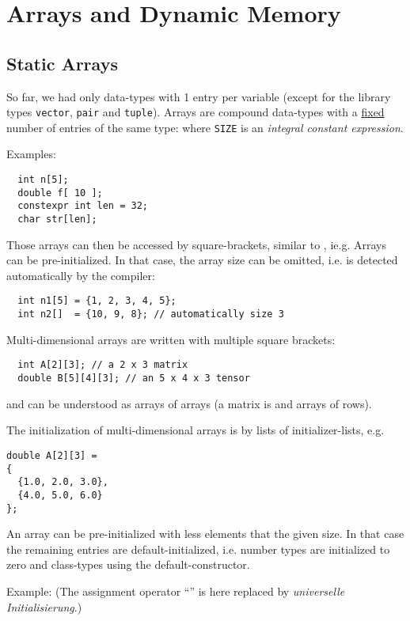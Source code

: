 \section{Arrays and Dynamic Memory}
\subsection{Static Arrays}
So far, we had only data-types with 1 entry per variable (except for the library types \texttt{vector}, \texttt{pair} and \texttt{tuple}).
Arrays are compound data-types with a \underline{fixed} number of entries of the same type:
%
%
where \texttt{SIZE} is an \emph{integral constant expression}.

Examples:
\begin{verbatim}
  int n[5];
  double f[ 10 ];
  constexpr int len = 32;
  char str[len];
\end{verbatim}
%
Those arrays can then be accessed by square-brackets, similar to , ie.g.
%
%
Arrays can be pre-initialized. In that case, the array size can be omitted, i.e. is detected
automatically by the compiler:
\begin{verbatim}
  int n1[5] = {1, 2, 3, 4, 5};
  int n2[]  = {10, 9, 8}; // automatically size 3
\end{verbatim}

Multi-dimensional arrays are written with multiple square brackets:
%
\begin{verbatim}
  int A[2][3]; // a 2 x 3 matrix
  double B[5][4][3]; // an 5 x 4 x 3 tensor
\end{verbatim}
%
and can be understood as arrays of arrays (a matrix is and arrays of rows).

The initialization of multi-dimensional arrays is by lists of initializer-lists, e.g.
%
\begin{verbatim}
double A[2][3] =
{
  {1.0, 2.0, 3.0},
  {4.0, 5.0, 6.0}
};
\end{verbatim}

\begin{rem}
  An array can be pre-initialized with less elements that the given size. In that case the remaining entries are default-initialized, i.e.
  number types are initialized to zero and class-types using the default-constructor.

  Example:
  (The assignment operator ``\cpp{=}'' is here replaced by \textit{universelle Initialisierung}.)
\end{rem}

